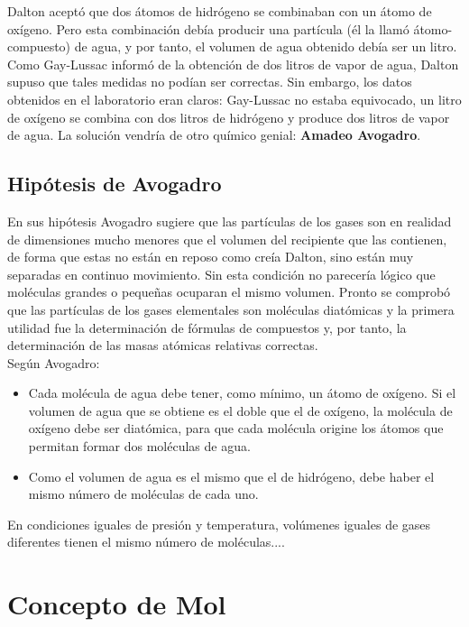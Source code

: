 Dalton aceptó que dos átomos de hidrógeno se combinaban con un átomo de oxígeno. Pero esta combinación debía producir una partícula (él la llamó átomo- compuesto) de agua, y por tanto, el volumen de agua obtenido debía ser un litro. Como Gay-Lussac informó de la obtención de dos litros de vapor de agua, Dalton supuso que tales medidas no podían ser correctas. Sin embargo, los datos obtenidos en el laboratorio eran claros: Gay-Lussac no estaba equivocado, un litro de oxígeno se combina con dos litros de hidrógeno y produce dos litros de vapor de agua. La solución vendría de otro químico genial: \textbf{Amadeo Avogadro}.

\subsection{Hipótesis de Avogadro}

En sus hipótesis Avogadro sugiere que las partículas de los gases son en realidad de dimensiones mucho menores que el volumen del recipiente que las contienen, de forma que estas no están en reposo como creía Dalton, sino están muy separadas en continuo movimiento. Sin esta condición no parecería lógico que moléculas grandes o pequeñas ocuparan el mismo volumen. Pronto se comprobó que las partículas de los gases elementales son moléculas diatómicas y la primera utilidad fue la determinación de fórmulas de compuestos y, por tanto, la determinación de las masas atómicas relativas correctas.\\

Según Avogadro:

\begin{itemize}
	\item Cada molécula de agua debe tener, como mínimo, un átomo de oxígeno. Si el volumen de agua que se obtiene es el doble que el de oxígeno, la molécula de oxígeno debe ser diatómica, para que cada molécula origine los átomos que permitan formar dos moléculas de agua.\\
	\item Como el volumen de agua es el mismo que el de hidrógeno, debe haber el mismo número de moléculas de cada uno.
\end{itemize}

\begin{law}
	En condiciones iguales de presión y temperatura, volúmenes iguales de gases diferentes tienen el mismo número de moléculas....
\end{law}

\section{Concepto de Mol}

